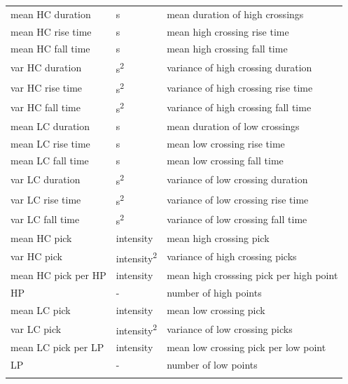 \documentclass[10pt]{article}
\begin{document}
\begin{table}[h]
\begin{tabular}{lll}
    mean HC duration & \si{s} &  mean duration of high crossings \\
    \addlinespace[2pt]
    mean HC rise time & \si{s} &  mean high crossing rise time \\
    \addlinespace[2pt]
    mean HC fall time & \si{s} &  mean high crossing fall time \\
    \addlinespace[2pt]
    var HC duration & \si{s^2} &  variance of high crossing duration \\
    \addlinespace[2pt]
    var HC rise time & \si{s^2} &  variance of high crossing rise time \\
    \addlinespace[2pt]
    var HC fall time & \si{s^2} &  variance of high crossing fall time \\
    \addlinespace[2pt]
    mean LC duration & \si{s} &  mean duration of low crossings \\
    \addlinespace[2pt]
    mean LC rise time & \si{s} &  mean low crossing rise time \\
    \addlinespace[2pt]
    mean LC fall time & \si{s} &  mean low crossing fall time \\
    \addlinespace[2pt]
    var LC duration & \si{s^2} &  variance of low crossing duration \\
    \addlinespace[2pt]
    var LC rise time & \si{s^2} &  variance of low crossing rise time \\
    \addlinespace[2pt]
    var LC fall time & \si{s^2} &  variance of low crossing fall time \\
    \addlinespace[2pt]
    mean HC pick & intensity &  mean high crossing pick \\
    \addlinespace[2pt]
    var HC pick & intensity\textsuperscript{2} &  variance of high crossing picks \\
    \addlinespace[2pt]
    mean HC pick per HP & intensity &  mean high crosssing pick per high point \\
    \addlinespace[2pt]
    HP & - &  number of high points \\
    \addlinespace[2pt]
    mean LC pick & intensity &  mean low crossing pick \\
    \addlinespace[2pt]
    var LC pick & intensity\textsuperscript{2} &  variance of low crossing picks \\
    \addlinespace[2pt]
    mean LC pick per LP & intensity &  mean low crossing pick per low point \\
    \addlinespace[2pt]
    LP & - &  number of low points \\
    \addlinespace[2pt]

\end{tabular}
\end{table}
\end{document}

